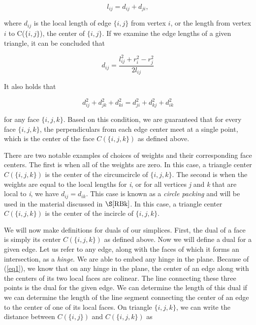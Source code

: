 \documentclass[12pt]{article}
\begin{document}
$$l_{ij} = d_{ij} + d_{ji},$$

\noindent where $d_{ij}$ is the local length of edge $\{i, j\}$ from vertex $i$, or the length from vertex $i$ to C($\{i, j\}$), the center of $\{i, j\}$. If we examine the edge lengths of a given triangle, it can be concluded that 

\begin{equation}
d_{ij} = \frac{l_{ij}^2 + r_i^2 - r_j^2}{2l_{ij}}
\label{eq2}
\end{equation}

\noindent It also holds that 

\begin{equation}
\label{eq1}
d_{ij}^2 + d_{jk}^2 + d_{ki}^2 = d_{ji}^2 + d_{kj}^2 + d_{ik}^2
\end{equation}

\noindent for any face $\{i, j, k\}$. Based on this condition, we are guaranteed that for every face $\{i, j, k\}$, the perpendiculars from each edge center meet at a single point, which is the center of the face $C(\{i, j, k\})$ as defined above\cite{Dave}.\newline

\noindent There are two notable examples of choices of weights and their corresponding face centers. The first is when all of the weights are zero. In this case, a triangle center $C(\{i, j, k\})$ is the center of the circumcircle of $\{i, j, k\}$. The second is when the weights are equal to the local lengths for \textit{i}, or for all vertices \textit{j} and \textit{k} that are local to \textit{i}, we have $d_{ij} = d_{ik}$. This case is known as a \textit{circle packing} and will be used in the material discussed in $\S\ref{RBk}$. In this case, a triangle center $C(\{i, j, k\})$ is the center of the incircle of $\{i, j, k\}$.\newline

\noindent We will now make definitions for duals of our simplices. First, the dual of a face is simply its center $C(\{i, j, k\})$ as defined above. Now we will define a dual for a given edge. Let us refer to any edge, along with the faces of which it forms an intersection, as a \textit{hinge}. We are able to embed any hinge in the plane. Because of (\ref{eq1}), we know that on any hinge in the plane, the center of an edge along with the centers of its two local faces are colinear. The line connecting these three points is the dual for the given edge. We can determine the length of this dual if we can determine the length of the line segment connecting the center of an edge to the center of one of its local faces. On triangle $\{i, j, k\}$, we can write the distance between $C(\{i, j\})$ and $C(\{i, j, k\})$ as 
\end{document}
